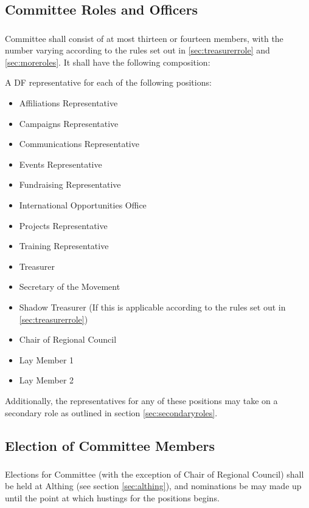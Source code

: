 \documentclass[a4paper, 12pt]{report}
\begin{document}
\subsection{Committee Roles and Officers}
\subsubsection{}
\label{sec:cttemembership}
Committee shall consist of at most thirteen or fourteen members, with the number varying according to the rules set out in \ref{sec:treasurerrole} and \ref{sec:moreroles}. It shall have the following composition:

A DF representative for each of the following positions:
\begin{itemize}
\item Affiliations Representative
\item Campaigns Representative
\item Communications Representative
\item Events Representative
\item Fundraising Representative
\item International Opportunities Office
\item Projects Representative
\item Training Representative
\item Treasurer
\item Secretary of the Movement
\item Shadow Treasurer (If this is applicable according to the rules set out in \ref{sec:treasurerrole})
\item Chair of Regional Council
\item Lay Member 1
\item Lay Member 2
\end{itemize}

Additionally, the representatives for any of these positions may take on a secondary role as outlined in section \ref{sec:secondaryroles}.

\subsection{Election of Committee Members}
\label{sec:election}
\subsubsection{}
Elections for Committee (with the exception of Chair of Regional Council) shall be held at Althing (see section \ref{sec:althing}), and nominations be may made up until the point at which hustings for the positions begins.
\end{document}
